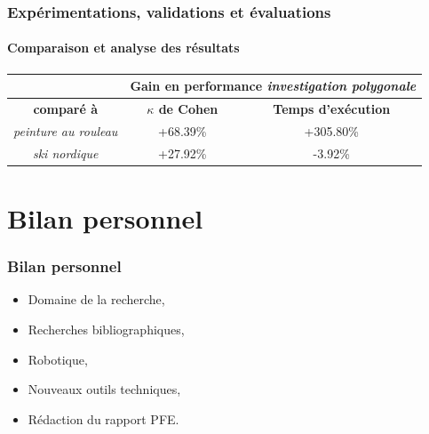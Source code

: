 \documentclass{beamer}
\begin{document}
			\begin{frame}
				\frametitle{Expérimentations, validations et évaluations}
				\framesubtitle{Comparaison et analyse des résultats}
				\begin{table}[H]
					\centering
					\begin{tabular}{|c|c|c|}
						\hline
						& \multicolumn{2}{c|}{\textbf{Gain en performance \textit{investigation polygonale}}} \\
						\hline
						\textbf{comparé à} & \textbf{$\kappa$ de Cohen} & \textbf{Temps d'exécution} \\
						\hline
						\textit{peinture au rouleau} & +68.39\% & +305.80\% \\
						\hline
						\textit{ski nordique} & +27.92\% & -3.92\% \\
						\hline
					\end{tabular}
				\end{table}
			\end{frame}
	\section{Bilan personnel}
		\begin{frame}
			\frametitle{Bilan personnel}
			\begin{itemize}
				\item Domaine de la recherche,
				\item Recherches bibliographiques,
				\item Robotique,
				\item Nouveaux outils techniques,
				\item Rédaction du rapport PFE.
			\end{itemize}
		\end{frame}
\end{document}
